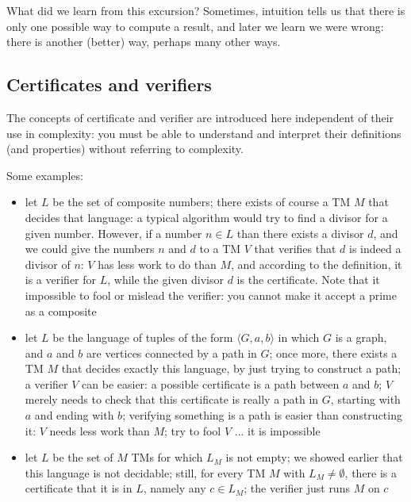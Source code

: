What did we learn from this excursion? Sometimes, intuition tells us
that there is only one possible way to compute a result, and later we
learn we were wrong: there is another (better) way, perhaps many other
ways.

\subsection{Certificates and verifiers}

The concepts of certificate and verifier are introduced here
independent of their use in complexity: you must be able to understand
and interpret their definitions (and properties) without referring to
complexity.



Some examples:
\begin{itemize}
\item 
let $L$ be the set of composite numbers; there exists of course a TM
$M$ that decides that language: a typical algorithm would try to find
a divisor for a given number. However, if a number $n \in L$ than
there exists a divisor $d$, and we could give the numbers $n$ and $d$
to a TM $V$ that verifies that $d$ is indeed a divisor of $n$: $V$
has less work to do than $M$, and according to the definition, it is a
verifier for $L$, while the given divisor $d$ is the certificate. Note
that it impossible to fool or mislead the verifier: you cannot make it
accept a prime as a composite

\item 
let $L$ be the language of tuples of the form $\langle G,a,b \rangle$
in which $G$ is a graph, and $a$ and $b$ are vertices connected by a
path in $G$; once more, there exists a TM $M$ that decides exactly
this language, by just trying to construct a path; a verifier $V$ can
be easier: a possible certificate is a path between $a$ and $b$; $V$
merely needs to check that this certificate is really a path in $G$,
starting with $a$ and ending with $b$; verifying something is a path
is easier than constructing it: $V$ needs less work than $M$; try to
fool $V$ ... it is impossible

\item
let $L$ be the set of $M$ TMs for which $L_M$ is not empty; we showed
earlier that this language is not decidable; still, for every TM $M$
with $L_M \neq \emptyset$, there is a certificate that it is in $L$,
namely any $c \in L_M$; the verifier just runs $M$ on $c$

\end{itemize}

